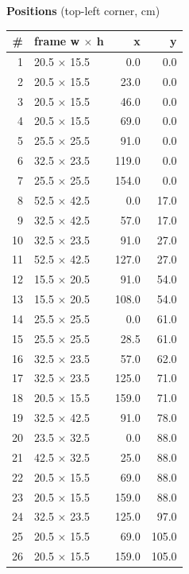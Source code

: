 \documentclass[a4paper,landscape,10pt]{article}
\begin{document}
\begin{minipage}[t]{0.25\textwidth}
\vspace{8pt}
{\bfseries Positions} (top-left corner, cm)\\[2pt]
\tiny
\begin{tabular}{@{}r l r r@{}}
\toprule
\# & frame w $\times$ h & x & y \\
\midrule
1 & 20.5 $\times$ 15.5 & 0.0 & 0.0 \\
2 & 20.5 $\times$ 15.5 & 23.0 & 0.0 \\
3 & 20.5 $\times$ 15.5 & 46.0 & 0.0 \\
4 & 20.5 $\times$ 15.5 & 69.0 & 0.0 \\
5 & 25.5 $\times$ 25.5 & 91.0 & 0.0 \\
6 & 32.5 $\times$ 23.5 & 119.0 & 0.0 \\
7 & 25.5 $\times$ 25.5 & 154.0 & 0.0 \\
8 & 52.5 $\times$ 42.5 & 0.0 & 17.0 \\
9 & 32.5 $\times$ 42.5 & 57.0 & 17.0 \\
10 & 32.5 $\times$ 23.5 & 91.0 & 27.0 \\
11 & 52.5 $\times$ 42.5 & 127.0 & 27.0 \\
12 & 15.5 $\times$ 20.5 & 91.0 & 54.0 \\
13 & 15.5 $\times$ 20.5 & 108.0 & 54.0 \\
14 & 25.5 $\times$ 25.5 & 0.0 & 61.0 \\
15 & 25.5 $\times$ 25.5 & 28.5 & 61.0 \\
16 & 32.5 $\times$ 23.5 & 57.0 & 62.0 \\
17 & 32.5 $\times$ 23.5 & 125.0 & 71.0 \\
18 & 20.5 $\times$ 15.5 & 159.0 & 71.0 \\
19 & 32.5 $\times$ 42.5 & 91.0 & 78.0 \\
20 & 23.5 $\times$ 32.5 & 0.0 & 88.0 \\
21 & 42.5 $\times$ 32.5 & 25.0 & 88.0 \\
22 & 20.5 $\times$ 15.5 & 69.0 & 88.0 \\
23 & 20.5 $\times$ 15.5 & 159.0 & 88.0 \\
24 & 32.5 $\times$ 23.5 & 125.0 & 97.0 \\
25 & 20.5 $\times$ 15.5 & 69.0 & 105.0 \\
26 & 20.5 $\times$ 15.5 & 159.0 & 105.0 \\
\bottomrule
\end{tabular}
\end{minipage}
\clearpage
\end{document}
